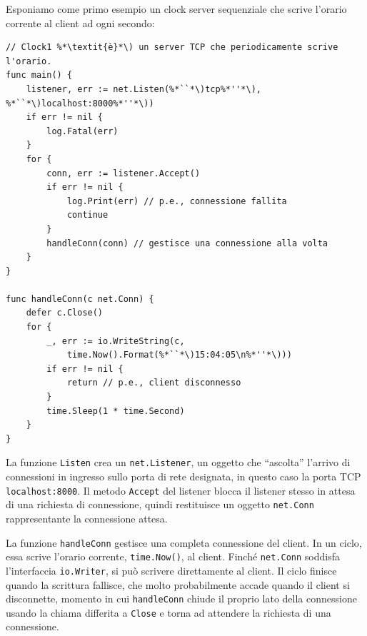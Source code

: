 Esponiamo come primo esempio un clock server sequenziale che scrive l'orario corrente al client ad ogni secondo:
\begin{lstlisting}[frame=single, label={lst:lstlisting7-2.1}]
// Clock1 %*\textit{è}*\) un server TCP che periodicamente scrive l'orario.
func main() {
    listener, err := net.Listen(%*``*\)tcp%*''*\), %*``*\)localhost:8000%*''*\))
    if err != nil {
        log.Fatal(err)
    }
    for {
        conn, err := listener.Accept()
        if err != nil {
            log.Print(err) // p.e., connessione fallita
            continue
        }
        handleConn(conn) // gestisce una connessione alla volta
    }
}

func handleConn(c net.Conn) {
    defer c.Close()
    for {
        _, err := io.WriteString(c,
            time.Now().Format(%*``*\)15:04:05\n%*''*\)))
        if err != nil {
            return // p.e., client disconnesso
        }
        time.Sleep(1 * time.Second)
    }
}
\end{lstlisting}
La funzione \verb|Listen| crea un \verb|net.Listener|, un oggetto che ``ascolta'' l'arrivo di connessioni in ingresso sullo porta di rete designata, in questo caso la porta TCP \verb|localhost:8000|.
Il metodo \verb|Accept| del listener blocca il listener stesso in attesa di una richiesta di connessione, quindi restituisce un oggetto \verb|net.Conn| rappresentante la connessione attesa.

La funzione \verb|handleConn| gestisce una completa connessione del client.
In un ciclo, essa scrive l'orario corrente, \verb|time.Now()|, al client.
Finché \verb|net.Conn| soddisfa l'interfaccia \verb|io.Writer|, si può scrivere direttamente al client.
Il ciclo finisce quando la scrittura fallisce, che molto probabilmente accade quando il client si disconnette, momento in cui \verb|handleConn| chiude il proprio lato della connessione usando la chiama differita a \verb|Close| e torna ad attendere la richiesta di una connessione.

